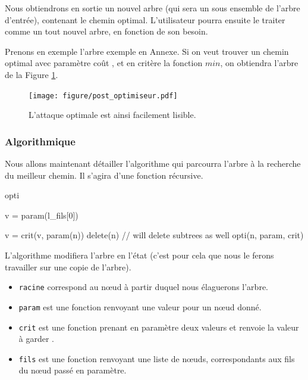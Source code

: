 		Nous obtiendrons en sortie un nouvel arbre (qui sera un sous ensemble de l'arbre d'entrée), contenant le chemin optimal. 
		L'utilisateur pourra ensuite le traiter comme un tout nouvel arbre, en fonction de son besoin.

		Prenons en exemple l'arbre exemple en Annexe. %
		Si on veut trouver un chemin optimal avec paramètre \og coût \fg, et en critère la fonction $min$, on obtiendra l'arbre de la Figure \ref{fig:arbre_post_opti}.

		\begin{figure}[h!]
			\centering
				\texttt{[image: figure/post\_optimiseur.pdf]}
			\caption{L'attaque optimale est ainsi facilement lisible.}
			\label{fig:arbre_post_opti}
		\end{figure}

			\subsubsection{Algorithmique}
		Nous allons maintenant détailler l'algorithme qui parcourra l'arbre à la recherche du meilleur chemin. Il s'agira d'une fonction récursive.

		\begin{algorithm}
		\caption{opti}
		\begin{algorithmic}

				\RETURN
			\ENDIF
				\STATE v = param(l_fils[0])

					\STATE v = crit(v, param(n))
				\ENDFOR
						\STATE delete(n) // will delete subtrees as well
					\ENDIF
				\ENDFOR
				\STATE opti(n, param, crit)
			\ENDFOR
		\end{algorithmic}
		\end{algorithm}

		L'algorithme modifiera l'arbre en l'état (c'est pour cela que nous le ferons travailler sur une copie de l'arbre).
		\begin{itemize}
			\item \verb|racine| correspond au nœud à partir duquel nous élaguerons l'arbre.
			\item \verb|param| est une fonction renvoyant une valeur pour un nœud donné.
			\item \verb|crit| est une fonction prenant en paramètre deux valeurs et renvoie la valeur à \og garder \fg.
			\item \verb|fils| est une fonction renvoyant une liste de nœuds, correspondants aux fils du nœud passé en paramètre.
		\end{itemize}

